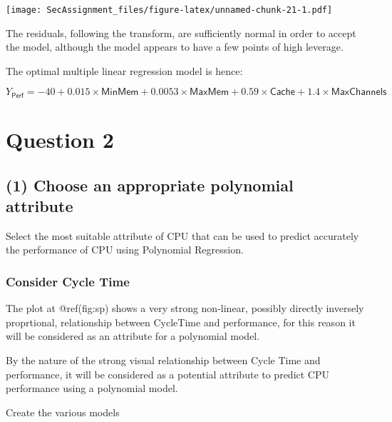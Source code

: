 \documentclass[12pt]{article}
\begin{document}
\texttt{[image: SecAssignment\_files/figure-latex/unnamed-chunk-21-1.pdf]}

The residuals, following the transform, are sufficiently normal in order
to accept the model, although the model appears to have a few points of
high leverage.

The optimal multiple linear regression model is hence:

\[
Y_{\textsf{Perf}} = -40 + 0.015\times \textsf{MinMem}  + 0.0053 \times \textsf{MaxMem} + 0.59\times \textsf{Cache} + 1.4\times \textsf{MaxChannels}
\]

\hypertarget{question-2}{%
\section{Question 2}\label{question-2}}

\hypertarget{choose-an-appropriate-polynomial-attribute}{%
\subsection{(1) Choose an appropriate polynomial
attribute}\label{choose-an-appropriate-polynomial-attribute}}

Select the most suitable attribute of CPU that can be used to predict
accurately the performance of CPU using Polynomial Regression.

\hypertarget{consider-cycle-time}{%
\subsubsection{Consider Cycle Time}\label{consider-cycle-time}}

The plot at @ref(fig:sp) shows a very strong non-linear, possibly
directly inversely proprtional, relationship between CycleTime and
performance, for this reason it will be considered as an attribute for a
polynomial model.

By the nature of the strong visual relationship between Cycle Time and
performance, it will be considered as a potential attribute to predict
CPU performance using a polynomial model.

Create the various models
\end{document}
